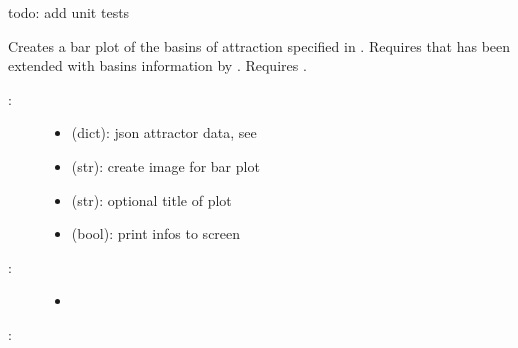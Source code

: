 \documentclass[letterpaper,10pt,english]{sphinxmanual}
\begin{document}
\begin{fulllineitems}
\label{\detokenize{Basins:PyBoolNet.Basins.create_barplot}}
todo: add unit tests

Creates a bar plot of the basins of attraction specified in .
Requires that  has been extended with basins information by .
Requires .
\begin{description}
\item[{:}] \leavevmode\begin{itemize}
\item {} 
 (dict): json attractor data, see {\hyperref[\detokenize{Attractors:attractors-compute-json}]{}}

\item {} 
 (str): create image for bar plot

\item {} 
 (str): optional title of plot

\item {} 
 (bool): print infos to screen

\end{itemize}

\item[{:}] \leavevmode\begin{itemize}
\item {} 

\end{itemize}

\end{description}

:

\begin{sphinxVerbatim}[commandchars=\\\{\}]
   
 
\end{sphinxVerbatim}

\end{fulllineitems}
\end{document}
